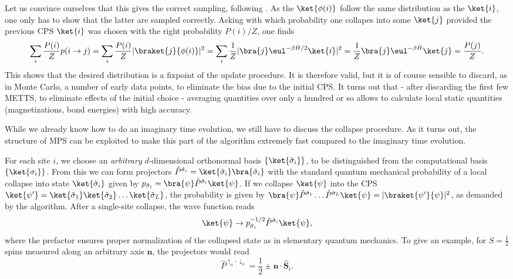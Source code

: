 Let us convince ourselves that this gives the correct sampling, following \cite{Stoudenmire10}. As the $\ket{\phi(i)}$ follow the same distribution as the $\ket{i}$, one only has to show that the latter are sampled correctly. Asking with which probability one collapes into some $\ket{j}$ provided the previous CPS $\ket{i}$ was chosen with the right probability $P(i)/Z$, one finds 
\begin{equation}
\sum_i \frac{P(i)}{Z} p(i\rightarrow j) = \sum_i \frac{P(i)}{Z} | \braket{j}{\phi(i)} |^2 = \sum_i
\frac{1}{Z} | \bra{j} \eul^{-\beta \hat{H}/2} \ket{i}|^2 = \frac{1}{Z} \bra{j} \eul^{-\beta\hat{H}} \ket{j} = \frac{P(j)}{Z}.
\end{equation}
This shows that the desired distribution is a fixpoint of the update procedure. It is therefore valid, but it is of course sensible to discard, as in Monte Carlo, a number of early data points, to eliminate the bias due to the initial CPS.  It turns out that - after discarding the first few METTS, to eliminate effects of the initial choice - averaging quantities over only a hundred or so allows to calculate local static quantities (magnetizations, bond energies) with high accuracy.

While we already know how to do an imaginary time evolution, we still have to discuss the collapse procedure. As it turns out, the structure of MPS can be exploited to make this part of the algorithm extremely fast compared to the imaginary time evolution.

For each site $i$, we choose an {\em arbitrary} $d$-dimensional orthonormal basis $\{ \ket{\tilde{\sigma}_i} \}$, to be distinguished from the computational basis $\{ \ket{\sigma_i} \}$. From this we can form projectors $\hat{P}^{\tilde{\sigma}_i} = \ket{\tilde{\sigma}_i} \bra{\tilde{\sigma}_i}$ with the standard quantum mechanical probability of a local collapse into state $\ket{\tilde{\sigma}_i}$ given by
$p_{\tilde{\sigma}_i} =\bra{\psi} \hat{P}^{\tilde{\sigma}_i} \ket{\psi}$. If we collapse $\ket{\psi}$ into the CPS
$\ket{\psi'} = \ket{ \tilde{\sigma}_1} \ket{ \tilde{\sigma}_2} \ldots \ket{ \tilde{\sigma}_L}$, the probability is given by  $\bra{\psi} \hat{P}^{\tilde{\sigma}_1} \ldots \hat{P}^{\tilde{\sigma}_L} \ket{\psi} = | \braket{\psi'}{\psi} |^2$, as demanded by the algorithm. After a single-site collapse, the wave function reads
\begin{equation}
\ket{\psi} \rightarrow  p_{\tilde{\sigma}_i}^{-1/2} \hat{P}^{\tilde{\sigma}_i}\ket{\psi} ,
\end{equation}
where the prefactor ensures proper normalization of the collapsed state as in elementary quantum mechanics. To give an example, for $S=\frac{1}{2}$ spins measured along an arbitrary axis ${\mathbf n}$, the projectors would read
\begin{equation}
\hat{P}^{\uparrow_n,\downarrow_n} = \frac{1}{2} \pm {\mathbf n} \cdot \hat{{\mathbf S}}_i .
\end{equation}

